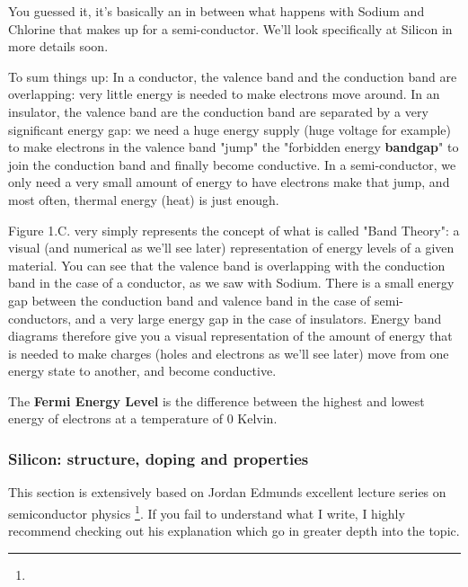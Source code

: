 You guessed it, it's basically an in between what happens with Sodium and Chlorine that makes up for a semi-conductor. We'll look specifically at Silicon in more details soon.  

To sum things up: In a conductor, the valence band and the conduction band are overlapping: very little energy is needed to make electrons move around. In an insulator, the valence band are the conduction band are separated by a very significant energy gap: we need a huge energy supply (huge voltage for example) to make electrons in the valence band "jump" the "forbidden energy \textbf{bandgap}" to join the conduction band and finally become conductive. In a semi-conductor, we only need a very small amount of energy to have electrons make that jump, and most often, thermal energy (heat) is just enough.  

Figure 1.C. very simply represents the concept of what is called "Band Theory": a visual (and numerical as we'll see later) representation of energy levels of a given material. You can see that the valence band is overlapping with the conduction band in the case of a conductor, as we saw with Sodium. There is a small energy gap between the conduction band and valence band in the case of semi-conductors, and a very large energy gap in the case of insulators. Energy band diagrams therefore give you a visual representation of the amount of energy that is needed to make charges (holes and electrons as we'll see later) move from one energy state to another, and become conductive. 

The \textbf{Fermi Energy Level} is the difference between the highest and lowest energy of electrons at a temperature of 0 Kelvin. 

\subsubsection{Silicon: structure, doping and properties}

This section is extensively based on Jordan Edmunds excellent lecture series on semiconductor physics \footnote{}. If you fail to understand what I write, I highly recommend checking out his explanation which go in greater depth into the topic. 


